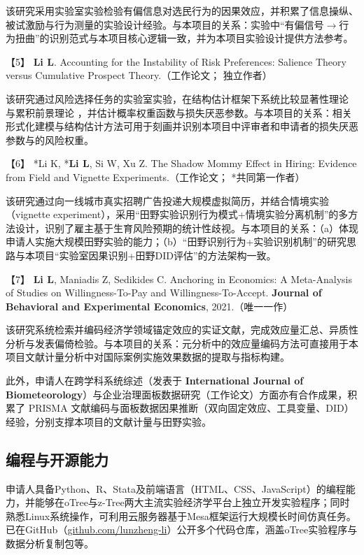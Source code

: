 该研究采用实验室实验检验有偏信息对选民行为的因果效应，并积累了信息操纵、被试激励与行为测量的实验设计经验。与本项目的关系：实验中“有偏信号$\to$行为扭曲”的识别范式与本项目核心逻辑一致，并为本项目实验设计提供方法参考。

【5】 \textbf{Li L}. Accounting for the Instability of Risk Preferences: Salience Theory versus Cumulative Prospect Theory.（工作论文； 独立作者）

该研究通过风险选择任务的实验室实验，在结构估计框架下系统比较显著性理论 \citep{Bordalo2012a} 与累积前景理论 \citep{Tversky1992}，并估计概率权重函数与损失厌恶参数。与本项目的关系：相关形式化建模与结构估计方法可用于刻画并识别本项目中评审者和申请者的损失厌恶参数与的风险权重。

【6】 *Li K, *\textbf{Li L}, Si W, Xu Z. The Shadow Mommy Effect in Hiring: Evidence from Field and Vignette Experiments.（工作论文； *共同第一作者）

该研究通过向一线城市真实招聘广告投递大规模虚拟简历，并结合情境实验（vignette experiment），采用“田野实验识别行为模式+情境实验分离机制”的多方法设计，识别了雇主基于生育风险预期的统计性歧视。与本项目的关系：（a）体现申请人实施大规模田野实验的能力；（b）“田野识别行为+实验识别机制”的研究思路与本项目“实验室因果识别+田野DID评估”的方法架构一致。

【7】 \textbf{Li L}, Maniadis Z, Sedikides C. Anchoring in Economics: A Meta-Analysis of Studies on Willingness-To-Pay and Willingness-To-Accept. \textbf{\textbf{Journal of Behavioral and Experimental Economics}}, 2021.（唯一一作）

该研究系统检索并编码经济学领域锚定效应的实证文献，完成效应量汇总、异质性分析与发表偏倚检验。与本项目的关系：元分析中的效应量编码方法可直接用于本项目文献计量分析中对国际案例实施效果数据的提取与指标构建。

此外，申请人在跨学科系统综述（发表于 \textbf{International Journal of Biometeorology}）与企业治理面板数据研究（工作论文）方面亦有合作成果，积累了 PRISMA 文献编码与面板数据因果推断（双向固定效应、工具变量、DID）经验，分别支撑本项目的文献计量与田野实验。

\subsection{\textbf{编程与开源能力}}

申请人具备Python、R、Stata及前端语言（HTML、CSS、JavaScript）的编程能力，并能够在oTree与z-Tree两大主流实验经济学平台上独立开发实验程序；同时熟悉Linux系统操作，可利用云服务器基于Mesa框架运行大规模长时间仿真任务。已在GitHub（\url{github.com/lunzheng-li}）公开多个代码仓库，涵盖oTree实验程序与数据分析复制包等。

